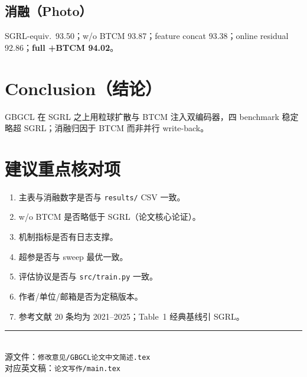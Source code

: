 \documentclass[11pt,a4paper]{article}
\begin{document}
\subsection{消融（Photo）}
SGRL-equiv.\ 93.50；w/o BTCM 93.87；feature concat 93.38；online residual 92.86；\textbf{full +BTCM 94.02}。

\section{Conclusion（结论）}

GBGCL 在 SGRL 之上用粒球扩散与 BTCM 注入双编码器，四 benchmark 稳定略超 SGRL；消融归因于 BTCM 而非并行 write-back。

\section{建议重点核对项}

\begin{enumerate}
  \item 主表与消融数字是否与 \texttt{results/} CSV 一致。
  \item w/o BTCM 是否略低于 SGRL（论文核心论证）。
  \item 机制指标是否有日志支撑。
  \item 超参是否与 sweep 最优一致。
  \item 评估协议是否与 \texttt{src/train.py} 一致。
  \item 作者/单位/邮箱是否为定稿版本。
  \item 参考文献 20 条均为 2021--2025；Table~1 经典基线引 SGRL。
\end{enumerate}

\vspace{1em}
\noindent\rule{\textwidth}{0.4pt}\\
\small
\noindent 源文件：\texttt{修改意见/GBGCL论文中文简述.tex}\\
对应英文稿：\texttt{论文写作/main.tex}
\end{document}
